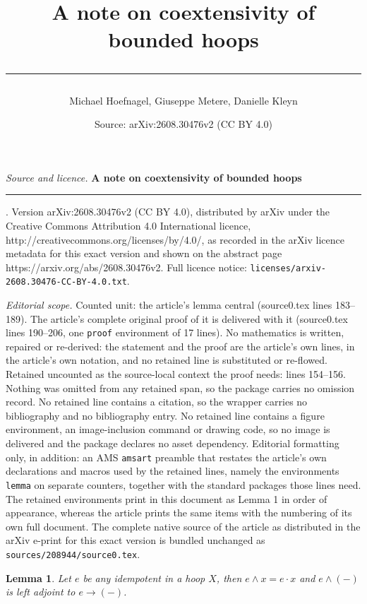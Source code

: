 \documentclass[10pt,a4paper]{amsart}
\title{\vspace{-2em} {\Huge\bfseries A note on coextensivity of bounded hoops}\\[1em] \rule{0.75\textwidth}{0.6pt}}
\author{Michael Hoefnagel, Giuseppe Metere, Danielle Kleyn}
\date{Source: arXiv:2608.30476v2 (CC BY 4.0)}
\newtheorem{lemma}{Lemma}
\begin{document}
\maketitle

\noindent\emph{Source and licence.} \vspace{-2em} {\Huge\bfseries A note on coextensivity of bounded hoops}\\[1em] \rule{0.75\textwidth}{0.6pt}. Version arXiv:2608.30476v2 (CC BY 4.0), distributed by arXiv under the Creative Commons Attribution 4.0 International licence, http://creativecommons.org/licenses/by/4.0/, as recorded in the arXiv licence metadata for this exact version and shown on the abstract page https://arxiv.org/abs/2608.30476v2. Full licence notice: \texttt{licenses/arxiv-2608.30476-CC-BY-4.0.txt}.\par\smallskip

\noindent\textit{Editorial scope.} Counted unit: the article's lemma central (source0.tex lines 183--189). The article's complete original proof of it is delivered with it (source0.tex lines 190--206, one \texttt{proof} environment of 17 lines). No mathematics is written, repaired or re-derived: the statement and the proof are the article's own lines, in the article's own notation, and no retained line is substituted or re-flowed.  Retained uncounted as the source-local context the proof needs: lines 154--156.  Nothing was omitted from any retained span, so the package carries no omission record.  No retained line contains a citation, so the wrapper carries no bibliography and no bibliography entry.  No retained line contains a figure environment, an image-inclusion command or drawing code, so no image is delivered and the package declares no asset dependency.  Editorial formatting only, in addition: an AMS \texttt{amsart} preamble that restates the article's own declarations and macros used by the retained lines, namely the environments \texttt{lemma} on separate counters, together with the standard packages those lines need.  The retained environments print in this document as Lemma 1 in order of appearance, whereas the article prints the same items with the numbering of its own full document.  The complete native source of the article as distributed in the arXiv e-print for this exact version is bundled unchanged as \texttt{sources/208944/source0.tex}.
\begin{lemma} \label{lemma: idempotent}
Let $e$ be any idempotent in a hoop $X$, then $e\wedge x = e\cdot x$ and $e \wedge (-)$ is left adjoint to $e \to (-)$.
\end{lemma}
\end{document}
